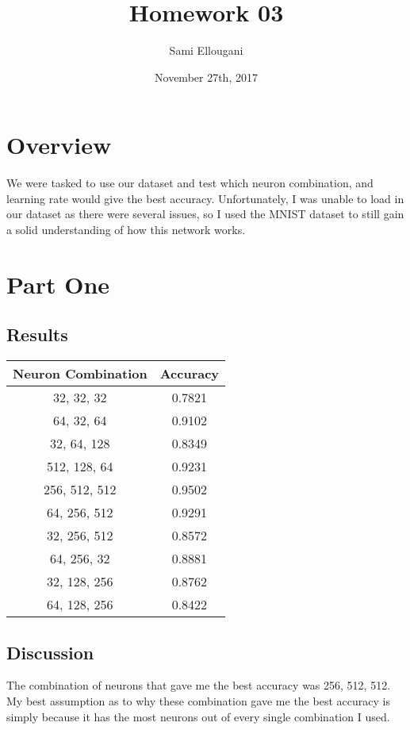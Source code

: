 \documentclass[a4paper]{article}
\title{Homework 03}
\author{Sami Ellougani}
\date{November 27th, 2017}
\begin{document}
\maketitle

\section{Overview}
We were tasked to use our dataset and test which neuron combination, and learning rate would give the best accuracy. Unfortunately, I was unable to load in our dataset as there were several issues, so I used the MNIST dataset to still gain a solid understanding of how this network works.

\section{Part One}
\subsection{Results}

\begin{table}[h!]
\centering
\begin{tabular}{||c c||} 
 \hline
 Neuron Combination & Accuracy \\ [0.5ex] 
 \hline\hline
 32, 32, 32 & 0.7821 \\ 
 64, 32, 64 & 0.9102 \\
 32, 64, 128 & 0.8349 \\
 512, 128, 64 & 0.9231 \\
 256, 512, 512 & 0.9502 \\ 
 64, 256, 512 & 0.9291 \\
 32, 256, 512 & 0.8572 \\
 64, 256, 32 & 0.8881 \\
 32, 128, 256 & 0.8762 \\ 
 64, 128, 256 & 0.8422 \\[1ex]
 \hline
\end{tabular}
\label{table:1}
\end{table}

\subsection{Discussion}
The combination of neurons that gave me the best accuracy was 256, 512, 512. My best assumption as to why these combination gave me the best accuracy is simply because it has the most neurons out of every single combination I used. 
\end{document}

